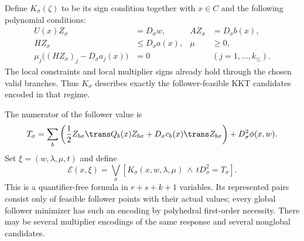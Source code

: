 Define $K_\sigma(\zeta)$ to be its sign condition together with $x\in C$
and the following polynomial conditions:
\begin{align}
 U(x)Z_\sigma&=D_\sigma w,& AZ_\sigma&=D_\sigma b(x),
 \label{eq:compressed-primal}\\
 HZ_\sigma&\le D_\sigma a(x),&\mu&\ge0,\nonumber\\
 \mu_j\bigl((HZ_\sigma)_j-D_\sigma a_j(x)\bigr)&=0
 &&(j=1,\ldots,k_{\le}).\nonumber
\end{align}
The local constraints and local multiplier signs already hold through
the chosen valid branches. Thus $K_\sigma$ describes exactly the
follower-feasible KKT candidates encoded in that regime.

The numerator of the follower value is
\begin{equation}\label{eq:candidate-value-numerator}
 T_\sigma=\sum_b\left(\frac12 Z_{b\sigma}\trans Q_b(x)Z_{b\sigma}
                 +D_\sigma c_b(x)\trans Z_{b\sigma}\right)
                       +D_\sigma^2\phi(x,w).
\end{equation}
Set $\xi=(w,\lambda,\mu,t)$ and define
\begin{equation}\label{eq:candidate-formula}
 \mathcal E(x,\xi)=\bigvee_\sigma
       \left[K_\sigma(x,w,\lambda,\mu)\ \wedge\
                         tD_\sigma^2=T_\sigma\right].
\end{equation}
This is a quantifier-free formula in $r+s+k+1$ variables. Its represented
pairs consist only of feasible follower points with their actual values;
every global follower minimizer has such an encoding by polyhedral
first-order necessity. There may be several multiplier encodings of the
same response and several nonglobal candidates.

